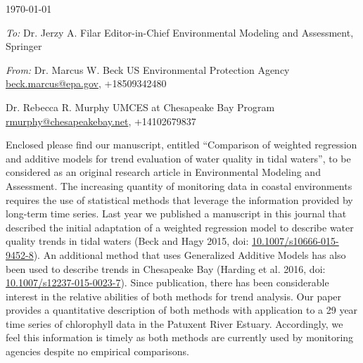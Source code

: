 \documentclass[a4paper,12pt]{article}
\begin{document}
\renewcommand{\rmdefault}{ptm}
\pagestyle{empty} 

\setlength{\parindent}{0mm} 
\setlength{\parskip}{5mm}

\begin{flushright}
\today
\end{flushright}

\emph{To:}\newline
Dr. Jerzy A. Filar\newline
Editor-in-Chief\newline
Environmental Modeling and Assessment, Springer

\emph{From:}\newline
Dr. Marcus W. Beck\newline
US Environmental Protection Agency\newline
\href{mailto:beck.marcus@epa.gov}{beck.marcus@epa.gov}, +18509342480

Dr. Rebecca R. Murphy\newline
UMCES at Chesapeake Bay Program\newline
\href{mailto:rmurphy@chesapeakebay.net}{rmurphy@chesapeakebay.net}, +14102679837 \vspace{14.5pt}

Enclosed please find our manuscript, entitled ``Comparison of weighted regression and additive models for trend evaluation of water quality in tidal waters'', to be considered as an original research article in Environmental Modeling and Assessment.  The increasing quantity of monitoring data in coastal environments requires the use of statistical methods that leverage the information provided by long-term time series. Last year we published a manuscript in this journal that described the initial adaptation of a weighted regression model to describe water quality trends in tidal waters (Beck and Hagy 2015, doi: \href{http://dx.doi.org/10.1007/s10666-015-9452-8}{10.1007/s10666-015-9452-8}).  An additional method that uses Generalized Additive Models has also been used to describe trends in Chesapeake Bay (Harding et al. 2016, doi: \href{http://dx.doi.org/10.1007/s12237-015-0023-7}{10.1007/s12237-015-0023-7}).  Since publication, there has been considerable interest in the relative abilities of both methods for trend analysis. Our paper provides a quantitative description of both methods with application to a 29 year time series of chlorophyll data in the Patuxent River Estuary. Accordingly, we feel this information is timely as both methods are currently used by monitoring agencies despite no empirical comparisons.   
\end{document}
